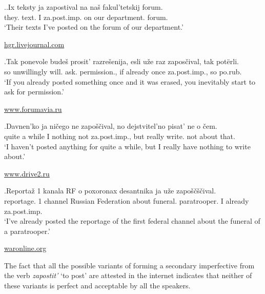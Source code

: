 \ex.\label{ex:zapostivat}\ag.Ix teksty ja zapostival na na\v{s} fakul'tetskij forum.\\
they. text. I za.post.imp. on our department. forum.\\
\vspace{0.5em}
`Their texts I've posted on the forum of our department.'
\begin{flushright}
\vspace{-1em}
\url{hgr.livejournal.com}
\end{flushright}
\bg.Tak ponevole bude\v{s} prosit' razre\v{s}enija, esli u\v{z}e raz zapos\v{c}ival, tak pot\"{e}rli.\\
so unwillingly will. ask. permission., if already once za.post.imp., so po.rub.\\
\vspace{0.5em}
`If you already posted something once and it was erased, you inevitably start to ask for permission.'
\begin{flushright}
\vspace{-1em}
\url{www.forumavia.ru}
\end{flushright}
\bg.Davnen'ko ja ni\v{c}ego ne zapo\v{s}\v{c}ival, no dejstvitel'no pisat' ne o \v{c}em.\\
{quite a while} I nothing not za.post.imp., but really write. not about that.\\
\vspace{0.5em}
`I haven't posted anything for quite a while, but I really have nothing to write about.'
\begin{flushright}
\vspace{-1em}
\url{www.drive2.ru}
\end{flushright}
\bg.Reporta\v{z} 1 kanala RF o poxoronax desantnika ja u\v{z}e zapo\v{s}\v{c}\v{s}\v{c}ival.\\
reportage. 1 channel {Russian Federation} about funeral. paratrooper. I already za.post.imp.\\
\vspace{0.5em}
`I've already posted the reportage of the first federal channel about the funeral of a paratrooper.'
\begin{flushright}
\vspace{-1em}
\url{waronline.org}
\end{flushright}

The fact that all the possible variants of forming a secondary imperfective from the verb \textit{zapostit'} `to post' are attested in the internet indicates that neither of these variants is perfect and acceptable by all the speakers.

